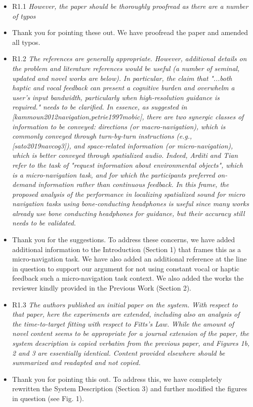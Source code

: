 \documentclass{scrartcl}
\begin{document}
\begin{itemize}
  \item R1.1 \textit{However, the paper should be thoroughly proofread as there are a number of typos}
  \item[] Thank you for pointing these out. We have proofread the paper and amended all typos.

  \item R1.2 \textit{The references are generally appropriate. However, additional details on the problem and literature references would be useful (a number of seminal, updated and novel works are below). In particular, the claim that "...both haptic and vocal feedback can present a cognitive burden and overwhelm a user’s input bandwidth, particularly when high-resolution guidance is required." needs to be clarified.
      In essence, as suggested in [kammoun2012navigation,petrie1997mobic], there are two synergic classes of information to be conveyed: directions (or macro-navigation), which is commonly conveyed through turn-by-turn instructions (e.g., [sato2019navcog3]), and space-related information (or micro-navigation), which is better conveyed through spatialized audio.
      Indeed, Arditi and Tian refer to the task of "request information about environmental objects", which is a micro-navigation task, and for which the participants preferred on-demand information rather than continuous feedback.
In this frame, the proposed analysis of the performance in localizing spatialized sound for micro navigation tasks using bone-conducting headphones is useful since many works already use bone conducting headphones for guidance, but their accuracy still needs to be validated.
}
  \item[] Thank you for the suggestions.
    To address these concerns, we have added additional information to the Introduction (Section 1) that frames this as a micro-navigation task.
    We have also added an additional reference at the line in question to support our argument for not using constant vocal or haptic feedback such a micro-navigation task context.
    We also added the works the reviewer kindly provided in the Previous Work (Section 2).

  \item R1.3 \textit{The authors published an initial paper on the system. With respect to that paper, here the experiments are extended, including also an analysis of the time-to-target fitting with respect to Fitts's Law.
    While the amount of novel content seems to be appropriate for a journal extension of the paper, the system description is copied verbatim from the previous paper, and Figures 1b, 2 and 3 are essentially identical. Content provided elsewhere should be summarized and readapted and not copied.}
  \item[] Thank you for pointing this out.
    To address this, we have completely rewritten the System Description (Section 3) and further modified the figures in question (see Fig. 1).


\end{itemize}
\end{document}
